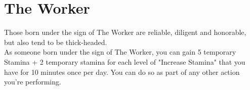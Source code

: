 \section{The Worker}

Those born under the sign of The Worker are reliable, diligent and honorable, but also tend to be thick-headed.\\
As someone born under the sign of The Worker, you can gain 5 temporary Stamina + 2 temporary stamina for each level of "Increase Stamina" that you have for 10 minutes once per day.
You can do so as part of any other action you're performing.\\